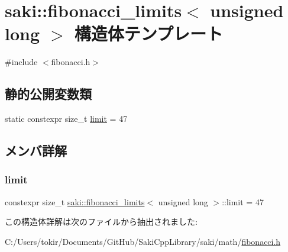 \hypertarget{structsaki_1_1fibonacci__limits_3_01unsigned_01long_01_4}{}\section{saki\+:\+:fibonacci\+\_\+limits$<$ unsigned long $>$ 構造体テンプレート}
\label{structsaki_1_1fibonacci__limits_3_01unsigned_01long_01_4}


{\ttfamily \#include $<$fibonacci.\+h$>$}

\subsection*{静的公開変数類}
\begin{DoxyCompactItemize}
\item 
static constexpr size\+\_\+t \mbox{\hyperlink{structsaki_1_1fibonacci__limits_3_01unsigned_01long_01_4_a0b28a208014b1ded506ddf31c7d7c32a}{limit}} = 47
\end{DoxyCompactItemize}


\subsection{メンバ詳解}
\mbox{\label{structsaki_1_1fibonacci__limits_3_01unsigned_01long_01_4_a0b28a208014b1ded506ddf31c7d7c32a}} 
\subsubsection{\texorpdfstring{limit}{limit}}
{\footnotesize\ttfamily constexpr size\+\_\+t \mbox{\hyperlink{structsaki_1_1fibonacci__limits}{saki\+::fibonacci\+\_\+limits}}$<$ unsigned long $>$\+::limit = 47\hspace{0.3cm}{\ttfamily [static]}}



この構造体詳解は次のファイルから抽出されました\+:\begin{DoxyCompactItemize}
\item 
C\+:/\+Users/tokir/\+Documents/\+Git\+Hub/\+Saki\+Cpp\+Library/saki/math/\mbox{\hyperlink{fibonacci_8h}{fibonacci.\+h}}\end{DoxyCompactItemize}
